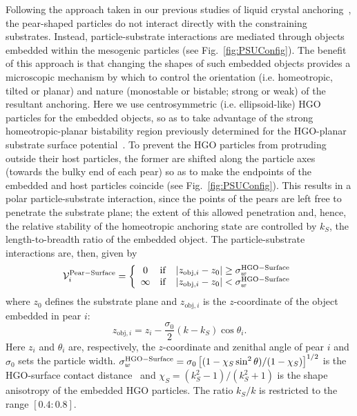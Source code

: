 \documentclass[aps,10pt,twocolumn]{revtex4}
\newcommand{\mrm}[1]{\ensuremath{\mathrm{#1}}}
\newcommand{\lp}{\left(}
\newcommand{\rp}{\right)}
\newcommand{\so}{\sigma_0}
\begin{document}
Following the approach taken in our previous studies of liquid crystal
anchoring~\cite{BarmesCleaver04a,BarmesCleaver04b}, the pear-shaped particles do not interact directly with the
constraining substrates. Instead, particle-substrate interactions are mediated through objects embedded within the
mesogenic particles (see Fig.~\ref{fig:PSUConfig}). The benefit of this approach is that changing the shapes of
such embedded objects provides a microscopic mechanism by which to control the orientation (i.e. homeotropic,
tilted or planar) and nature (monostable or bistable; strong or weak) of the resultant anchoring. Here we use
centrosymmetric (i.e. ellipsoid-like) HGO particles for the embedded objects, so as to take advantage of the
strong homeotropic-planar bistability region previously determined for the HGO-planar substrate surface
potential~\cite{BarmesCleaver04b}. To prevent the HGO particles from protruding outside their host particles, the
former are shifted along the particle axes (towards the bulky end of each pear) so as to make the endpoints of the
embedded and host particles coincide (see Fig.~\ref{fig:PSUConfig}). This results in a polar particle-substrate
interaction, since the points of the pears are left free to penetrate the substrate plane; the extent of this
allowed penetration and, hence, the relative stability of the homeotropic anchoring state are controlled by $k_S$,
the length-to-breadth ratio of the embedded object. The particle-substrate interactions are, then, given by
\begin{equation}
\label{eqn:Pear-Surface}
    \mathcal{V}_i^{\rm{Pear-Surface}} = \left\{ %
    \begin{array}{ccc}
        0   &\mathrm{if}    &|z_{\mrm{obj},i} - z_0| \geq \sigma^{\rm{HGO-Surface}}_w    \\
        \infty  &\mathrm{if}    &|z_{\mrm{obj},i} - z_0| < \sigma^{\rm{HGO-Surface}}_w
    \end{array}
    \right.
\end{equation}
where $z_0$ defines the substrate plane and $z_{\mrm{obj},i}$ is the $z$-coordinate of the object embedded in pear
$i$:
\begin{equation}
    z_{\mrm{obj},i} = z_i - \frac{\sigma_0}{2}\lp k - k_S\rp\cos\theta_i .
\end{equation}
Here $z_i$ and $\theta_i$ are, respectively, the $z$-coordinate and zenithal angle of pear $i$ and $\sigma_0$ sets
the particle width. $\sigma^{\rm{HGO-Surface}}_w=\so\left[ (1-\chi_S\sin^2\theta)/(1-\chi_S) \right]^{1/2}$ is the
HGO-surface contact distance~\cite{BarmesCleaver04b} and $\chi_S=(k^2_S-1)/(k^2_S+1)$ is the shape anisotropy of
the embedded HGO particles. The ratio $k_S/k$ is restricted to the range $[0.4:0.8]$.
\end{document}

